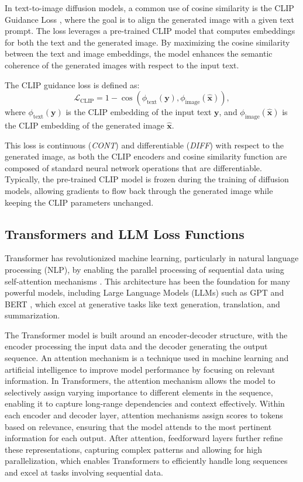 \documentclass[sn-mathphys-num]{sn-jnl}%
\newcommand \cont{\textit{CONT}}
\newcommand \diff{\textit{DIFF}}
\begin{document}
In text-to-image diffusion models, a common use of cosine similarity is the CLIP Guidance Loss \cite{rombach2022high}, where the goal is to align the generated image with a given text prompt. The loss leverages a pre-trained CLIP model that computes embeddings for both the text and the generated image. By maximizing the cosine similarity between the text and image embeddings, the model enhances the semantic coherence of the generated images with respect to the input text.

The CLIP guidance loss is defined as:
\begin{equation}\label{eq:clip_loss}
    \mathcal{L}_{\text{CLIP}} = 1 - \cos(\phi_{\text{text}}(\mathbf{y}), \phi_{\text{image}}(\hat{\mathbf{x}})),
\end{equation}
where $\phi_{\text{text}}(\mathbf{y})$ is the CLIP embedding of the input text $\mathbf{y}$, and $\phi_{\text{image}}(\hat{\mathbf{x}})$ is the CLIP embedding of the generated image $\hat{\mathbf{x}}$.

This loss is continuous (\cont) and differentiable (\diff) with respect to the generated image, as both the CLIP encoders and cosine similarity function are composed of standard neural network operations that are differentiable. Typically, the pre-trained CLIP model is frozen during the training of diffusion models, allowing gradients to flow back through the generated image while keeping the CLIP parameters unchanged.

\subsection{Transformers and LLM Loss Functions}\label{sec:transformers}
Transformer has revolutionized machine learning, particularly in natural language processing (NLP), by enabling the parallel processing of sequential data using self-attention mechanisms \cite{vaswani2017attention}. This architecture has been the foundation for many powerful models, including Large Language Models (LLMs) such as GPT \cite{radford2019language} and BERT \cite{devlin2018bert}, which excel at generative tasks like text generation, translation, and summarization.

The Transformer model is built around an encoder-decoder structure, with the encoder processing the input data and the decoder generating the output sequence. An attention mechanism is a technique used in machine learning and artificial intelligence to improve model performance by focusing on relevant information. In Transformers, the attention mechanism allows the model to selectively assign varying importance to different elements in the sequence, enabling it to capture long-range dependencies and context effectively. Within each encoder and decoder layer, attention mechanisms assign scores to tokens based on relevance, ensuring that the model attends to the most pertinent information for each output. After attention, feedforward layers further refine these representations, capturing complex patterns and allowing for high parallelization, which enables Transformers to efficiently handle long sequences and excel at tasks involving sequential data.
\end{document}
